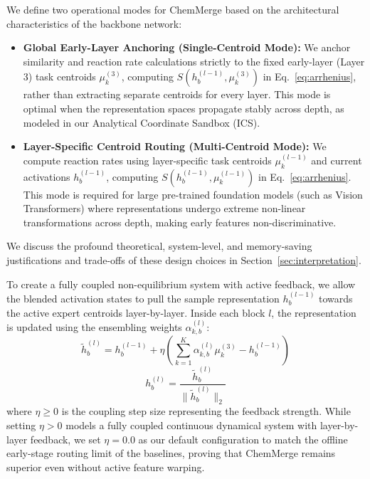 We define two operational modes for ChemMerge based on the architectural characteristics of the backbone network:
\begin{itemize}
    \item \textbf{Global Early-Layer Anchoring (Single-Centroid Mode):} We anchor similarity and reaction rate calculations strictly to the fixed early-layer (Layer 3) task centroids $\mu_k^{(3)}$, computing $S(h_b^{(l-1)}, \mu_k^{(3)})$ in Eq.~\ref{eq:arrhenius}, rather than extracting separate centroids for every layer. This mode is optimal when the representation spaces propagate stably across depth, as modeled in our Analytical Coordinate Sandbox (ICS).
    \item \textbf{Layer-Specific Centroid Routing (Multi-Centroid Mode):} We compute reaction rates using layer-specific task centroids $\mu_k^{(l-1)}$ and current activations $h_b^{(l-1)}$, computing $S(h_b^{(l-1)}, \mu_k^{(l-1)})$ in Eq.~\ref{eq:arrhenius}. This mode is required for large pre-trained foundation models (such as Vision Transformers) where representations undergo extreme non-linear transformations across depth, making early features non-discriminative.
\end{itemize}
We discuss the profound theoretical, system-level, and memory-saving justifications and trade-offs of these design choices in Section~\ref{sec:interpretation}.

To create a fully coupled non-equilibrium system with active feedback, we allow the blended activation states to pull the sample representation $h_b^{(l-1)}$ towards the active expert centroids layer-by-layer. Inside each block $l$, the representation is updated using the ensembling weights $\alpha_{k, b}^{(l)}$:
\begin{equation}
\tilde{h}_b^{(l)} = h_b^{(l-1)} + \eta \left( \sum_{k=1}^K \alpha_{k, b}^{(l)} \mu_k^{(3)} - h_b^{(l-1)} \right)
\end{equation}
\begin{equation}
h_b^{(l)} = \frac{\tilde{h}_b^{(l)}}{\|\tilde{h}_b^{(l)}\|_2}
\end{equation}
where $\eta \ge 0$ is the coupling step size representing the feedback strength. While setting $\eta > 0$ models a fully coupled continuous dynamical system with layer-by-layer feedback, we set $\eta = 0.0$ as our default configuration to match the offline early-stage routing limit of the baselines, proving that ChemMerge remains superior even without active feature warping. 

